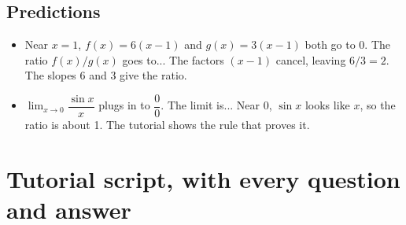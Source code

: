 \documentclass[11pt]{article}
\begin{document}
\subsection*{Predictions}\begin{itemize}
\item Near $x=1$, $f(x)=6(x-1)$ and $g(x)=3(x-1)$ both go to 0. The ratio $f(x)/g(x)$ goes to...  The factors $(x-1)$ cancel, leaving $6/3=2$. The slopes 6 and 3 give the ratio.
\item $\displaystyle\lim_{x\to0}\dfrac{\sin x}{x}$ plugs in to $\dfrac00$. The limit is...  Near 0, $\sin x$ looks like $x$, so the ratio is about 1. The tutorial shows the rule that proves it.
\end{itemize}
\section*{Tutorial script, with every question and answer}
\end{document}

